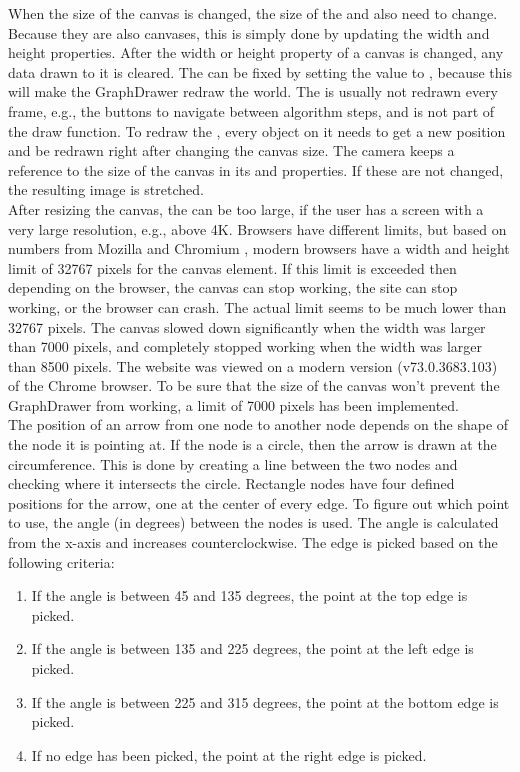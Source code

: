 When the size of the canvas is changed, the size of the  and  also need to change. Because they are also canvases, this is simply done by updating the width and height properties. After the width or height property of a canvas is changed, any data drawn to it is cleared. The  can be fixed by setting the  value to , because this will make the GraphDrawer redraw the world. The  is usually not redrawn every frame, e.g., the buttons to navigate between algorithm steps, and is not part of the draw function. To redraw the , every object on it needs to get a new position and be redrawn right after changing the canvas size. The camera keeps a reference to the size of the canvas in its  and  properties. If these are not changed, the resulting image is stretched. 
\\[11pt]
After resizing the canvas, the  can be too large, if the user has a screen with a very large resolution, e.g., above 4K. Browsers have different limits, but based on numbers from Mozilla \cite{CanvasMaxSize} and Chromium \cite{CanvasMaxSizeChromeium}, modern browsers have a width and height limit of 32767 pixels for the canvas element. If this limit is exceeded then depending on the browser, the canvas can stop working, the site can stop working, or the browser can crash. The actual limit seems to be much lower than 32767 pixels. The canvas slowed down significantly when the width was larger than 7000 pixels, and completely stopped working when the width was larger than 8500 pixels. The website was viewed on a modern version (v73.0.3683.103) of the Chrome browser. To be sure that the size of the canvas won't prevent the GraphDrawer from working, a limit of 7000 pixels has been implemented.
\\[11pt]
The position of an arrow from one node to another node depends on the shape of the node it is pointing at. If the node is a circle, then the arrow is drawn at the circumference. This is done by creating a line between the two nodes and checking where it intersects the circle. Rectangle nodes have four defined positions for the arrow, one at the center of every edge. To figure out which point to use, the angle (in degrees) between the nodes is used. The angle is calculated from the x-axis and increases counterclockwise. The edge is picked based on the following criteria:
\begin{enumerate}
    \item If the angle is between 45 and 135 degrees, the point at the top edge is picked.
    \item If the angle is between 135 and 225 degrees, the point at the left edge is picked.
    \item If the angle is between 225 and 315 degrees, the point at the bottom edge is picked.
    \item If no edge has been picked, the point at the right edge is picked.
\end{enumerate}
